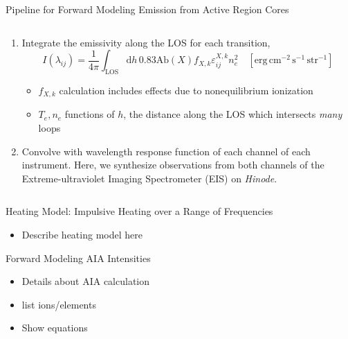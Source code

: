 \documentclass[final,12pt]{beamer}
\begin{document}
\begin{frame}
\begin{columns}[T]
\begin{column}{0.49\linewidth}
\begin{block}{Pipeline for Forward Modeling Emission from Active Region Cores}
\begin{columns}[T]
\begin{column}{0.59\columnwidth}
\begin{enumerate}
\begin{equation*}
            \end{equation*}
            where all atomic data comes from the CHIANTI atomic database \citep{young_chianti_2016,dere_chianti_1997}
          \item Integrate the emissivity along the LOS for each transition,
            \begin{equation*}
              I(\lambda_{ij}) = \frac{1}{4\pi}\int_{\mathrm{LOS}}\mathrm{d}h\,0.83\mathrm{Ab}(X)f_{X,k}\varepsilon_{ij}^{X,k}n_e^2 \quad [\mathrm{erg}\,\mathrm{cm}^{-2}\,\mathrm{s}^{-1}\,\mathrm{str}^{-1}]
            \end{equation*}
            \begin{itemize}
              \item $f_{X,k}$ calculation includes effects due to nonequilibrium ionization \citep[e.g.][]{bradshaw_numerical_2009,bradshaw_what_2011}
              \item $T_e,n_e$ functions of $h$, the distance along the LOS which intersects \textit{many} loops
            \end{itemize}
          \item Convolve with wavelength response function of each channel of each instrument. Here, we synthesize observations from both channels of the Extreme-ultraviolet Imaging Spectrometer (EIS) on \textit{Hinode}.
        \end{enumerate}
      \end{column}
      \end{columns}
    \end{block}
    \begin{block}{Heating Model: Impulsive Heating over a Range of Frequencies}
      \begin{itemize}
        \item Describe heating model here
      \end{itemize}
    \end{block}
    \begin{block}{Forward Modeling AIA Intensities}
      \begin{itemize}
        \item Details about AIA calculation
        \item list ions/elements
        \item Show equations
      \end{itemize}
    \end{block}

\end{column}
\end{columns}
\end{frame}
\end{document}
